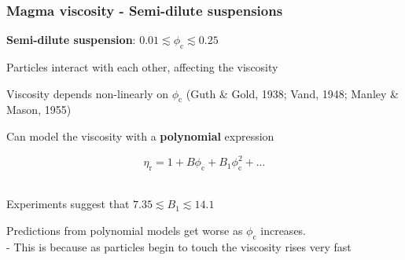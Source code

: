 \documentclass{beamer}
\begin{document}
\begin{frame}
  \frametitle{Magma viscosity - Semi-dilute suspensions}

  \footnotesize \textbf{Semi-dilute suspension}: $0.01 \lesssim \phi_{\text{c}} \lesssim 0.25$ \\

  \vspace{0.5cm}

  Particles interact with each other, affecting the viscosity \\

  \vspace{0.5cm}

  Viscosity depends non-linearly on $\phi_{\text{c}}$ (Guth \& Gold, 1938; Vand, 1948; Manley \& Mason, 1955) \\

  \vspace{0.5cm}

  Can model the viscosity with a \textbf{polynomial} expression \\

  \vspace{0.5cm}

  $$ \eta_{\text{r}} = 1 + B \phi_{\text{c}} + B_{1} \phi_{\text{c}}^{2} + ... $$ \\

  \vspace{0.5cm}

  Experiments suggest that $7.35 \lesssim B_{1} \lesssim 14.1$ \\

  \vspace{0.5cm}

  Predictions from polynomial models get worse as $\phi_{\text{c}}$ increases. \\
  \hspace*{1cm} - This is because as particles begin to touch the viscosity rises very fast \\

  
  \end{frame}
\end{document}
